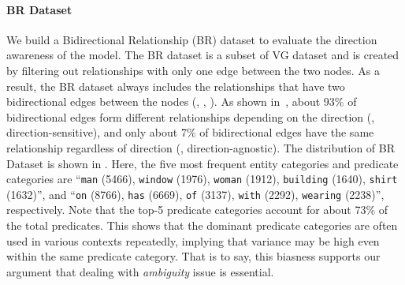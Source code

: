         \paragraph{BR Dataset}
            We build a Bidirectional Relationship (BR) dataset to evaluate the direction awareness of the model.
            The BR dataset is a subset of VG dataset and is created by filtering out relationships with only one edge between the two nodes.
            As a result, the BR dataset always includes the relationships that have two bidirectional edges between the nodes (\eg, , ).
            As shown in~, about 93\% of bidirectional edges form different relationships depending on the direction (\ie, direction-sensitive), and only about 7\% of bidirectional edges have the same relationship regardless of direction (\ie, direction-agnostic).
            The distribution of BR Dataset is shown in . Here, the five most frequent entity categories and predicate categories are ``\texttt{man} (5466), \texttt{window} (1976), \texttt{woman} (1912), \texttt{building} (1640), \texttt{shirt} (1632)'', and ``\texttt{on} (8766), \texttt{has} (6669), \texttt{of} (3137), \texttt{with} (2292), \texttt{wearing} (2238)'', respectively. Note that the top-5 predicate categories account for about 73\% of the total predicates.
            This shows that the dominant predicate categories are often used in various contexts repeatedly, implying that variance may be high even within the same predicate category.
            That is to say, this biasness supports our argument that dealing with \textit{ambiguity} issue is essential.
            
